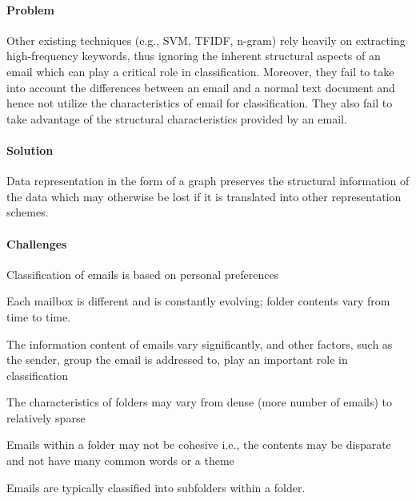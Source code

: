 \documentclass[12pt]{article}
\newenvironment{my_itemize}
{\begin{itemize}
  \setlength{\itemsep}{0cm}
  \setlength{\parskip}{0cm}}
{\end{itemize}}
\begin{document}
\paragraph{Problem}
\begin{my_itemize}
 \item Other existing techniques (e.g., SVM, TFIDF, n-gram) rely heavily on extracting high-frequency keywords, thus ignoring the inherent structural aspects of an email which can play a critical role in classification.  Moreover, they fail to take into account the differences between an email and a normal text document and hence not utilize the characteristics of email for classification. They also fail to take advantage of the structural characteristics provided by an email.
\end{my_itemize}

\paragraph{Solution}
\begin{my_itemize}
 \item Data representation in the form of a graph preserves the structural information of the data which may otherwise be lost if it is translated into other representation schemes. 
\end{my_itemize}

\paragraph{Challenges}
\begin{my_itemize}
 \item Classification of emails is based on personal preferences	
 \item Each mailbox is different and is constantly evolving; folder contents vary from time to time.
 \item The information content of emails vary significantly, and other factors, such as the sender, group the email is addressed to, play an important role in classification	 	
 \item The characteristics of folders may vary from dense (more number of emails) to relatively sparse
 \item Emails within a folder may not be cohesive i.e., the contents may be disparate and not have many common words or a theme
 \item Emails are typically classified into subfolders within a folder.
\end{my_itemize}
\end{document}
